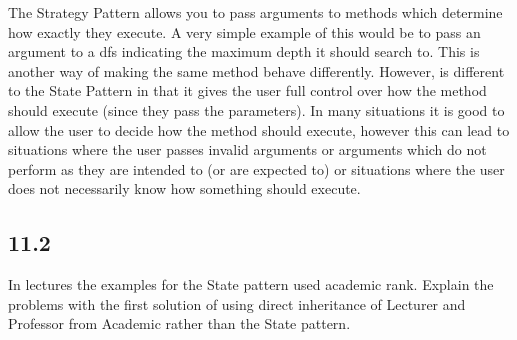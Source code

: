 \documentclass[10pt,\jkfside,a4paper]{article}
\begin{document}
The Strategy Pattern allows you to pass arguments to methods which determine how exactly they execute. A 
very simple example of this would be to pass an argument to a dfs indicating the maximum depth it should 
search to. This is another way of making the same method behave differently. However, is different to the 
State Pattern in that it gives the user full control over how the method should execute (since they pass the 
parameters). In many situations it is good to allow the user to decide how the method should execute, however 
this can lead to situations where the user passes invalid arguments or arguments which do not perform as they 
are intended to (or are expected to) or situations where the user does not necessarily know how something should 
execute.

\subsection*{11.2} In lectures the examples for the State pattern used academic rank. Explain 
the problems with the first solution of using direct inheritance of Lecturer and Professor from 
Academic rather than the State pattern.
\end{document}
